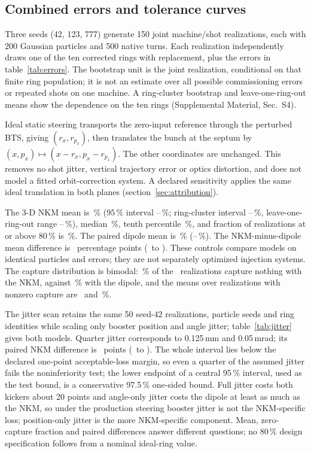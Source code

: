 \documentclass[aps,prab,reprint,amsmath,amssymb,floatfix,longbibliography]{revtex4-2}
\begin{document}
\subsection{Combined errors and tolerance curves}

Three seeds (42, 123, 777) generate 150 joint machine/shot realizations, each with 200 Gaussian particles and 500 native turns. Each realization independently draws one of the ten corrected rings with replacement, plus the errors in table~\ref{tab:errors}. The bootstrap unit is the joint realization, conditional on that finite ring population; it is not an estimate over all possible commissioning errors or repeated shots on one machine. A ring-cluster bootstrap and leave-one-ring-out means show the dependence on the ten rings (Supplemental Material, Sec.~S4).

Ideal static steering transports the zero-input reference through the perturbed BTS, giving $(r_x,r_{p_x})$, then translates the bunch at the septum by $(x,p_x)\mapsto(x-r_x,p_x-r_{p_x})$. The other coordinates are unchanged. This removes no shot jitter, vertical trajectory error or optics distortion, and does not model a fitted orbit-correction system. A declared sensitivity applies the same ideal translation in both planes (section~\ref{sec:attribution}).

The 3-D NKM mean is \FinalNkmMean\,\% (95\,\% interval \FinalNkmLo--\FinalNkmHi\,\%; ring-cluster interval \FinalNkmRingLo--\FinalNkmRingHi\,\%, leave-one-ring-out range \FinalNkmLooMin--\FinalNkmLooMax\,\%), median \FinalNkmMedian\,\%, tenth percentile \FinalNkmPten\,\%, and fraction of realizations at or above 80\,\% is \FinalNkmAboveEighty\,\%. The paired dipole mean is \FinalDipMean\,\% (\FinalDipLo--\FinalDipHi\,\%). The NKM-minus-dipole mean difference is \FinalControlDiff\ percentage points (\FinalControlDiffLo\ to \FinalControlDiffHi). These controls compare models on identical particles and errors; they are not separately optimized injection systems. The capture distribution is bimodal: \ZeroCapNkm\,\% of the \ZeroCapN\ realizations capture nothing with the NKM, against \ZeroCapDip\,\% with the dipole, and the means over realizations with nonzero capture are \CondMeanNkm\ and \CondMeanDip\,\%.

The jitter scan retains the same 50 seed-42 realizations, particle seeds and ring identities while scaling only booster position and angle jitter; table~\ref{tab:jitter} gives both models. Quarter jitter corresponds to 0.125\,mm and 0.05\,mrad; its paired NKM difference is \FinalJitterQuarterDiff\ points (\FinalJitterQuarterDiffLo\ to \FinalJitterQuarterDiffHi). The whole interval lies below the declared one-point acceptable-loss margin, so even a quarter of the assumed jitter fails the noninferiority test; the lower endpoint of a central 95\,\% interval, used as the test bound, is a conservative 97.5\,\% one-sided bound. Full jitter costs both kickers about 20 points and angle-only jitter costs the dipole at least as much as the NKM, so under the production steering booster jitter is not the NKM-specific loss; position-only jitter is the more NKM-specific component. Mean, zero-capture fraction and paired differences answer different questions; no 80\,\% design specification follows from a nominal ideal-ring value.
\end{document}
